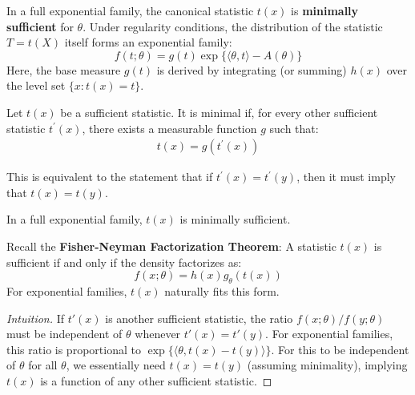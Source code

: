 In a full exponential family, the canonical statistic $t(x)$ is \textbf{minimally sufficient} for $\theta$. Under regularity conditions, the distribution of the statistic $T = t(X)$ itself forms an exponential family:
\begin{equation}
    f(t; \theta) = g(t) \exp\{\langle \theta, t \rangle - A(\theta)\}
\end{equation}
Here, the base measure $g(t)$ is derived by integrating (or summing) $h(x)$ over the level set $\{x : t(x) = t\}$.

\begin{de}
    Let $t(x)$ be a sufficient statistic. It is minimal if, for every other sufficient statistic $t^{\prime}(x)$, there exists a measurable function $g$ such that:
\begin{align*}
t(x)=g\left(t^{\prime}(x)\right)
\end{align*}
\end{de}

\begin{remark}
    This is equivalent to the statement that if $t^{\prime}(x)=t^{\prime}(y)$, then it must imply that $t(x)=t(y)$.
\end{remark}

\begin{prop}
    In a full exponential family, $t(x)$ is minimally sufficient.
\end{prop}
\begin{remark}
    Recall the \textbf{Fisher-Neyman Factorization Theorem}: A statistic $t(x)$ is sufficient if and only if the density factorizes as:
\begin{equation}
    f(x; \theta) = h(x) g_\theta(t(x))
\end{equation}
For exponential families, $t(x)$ naturally fits this form.
\end{remark}
\begin{proof}[Intuition]
If $t'(x)$ is another sufficient statistic, the ratio $f(x;\theta)/f(y;\theta)$ must be independent of $\theta$ whenever $t'(x) = t'(y)$. For exponential families, this ratio is proportional to $\exp\{\langle \theta, t(x) - t(y) \rangle\}$. For this to be independent of $\theta$ for all $\theta$, we essentially need $t(x) = t(y)$ (assuming minimality), implying $t(x)$ is a function of any other sufficient statistic.
\end{proof}


